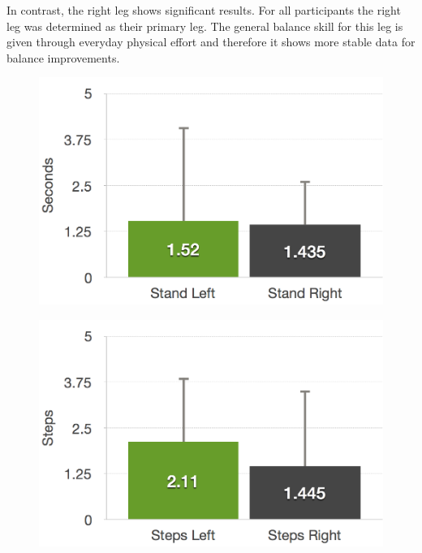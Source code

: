 In contrast, the right leg shows significant results.
For all participants the right leg was determined as their primary leg.
The general balance skill for this leg is given through everyday physical effort and therefore it shows more stable data for balance improvements.

\begin{figure}[htb]
	\centering
	\begin{minipage}[t]{0.32\linewidth}
		\centering
		\includegraphics[width=1\linewidth]{Pictures/6_4_DIA_StandAllDiff}
		\label{fig:6_4_standAllDiff}
	\end{minipage}
	\hfill
	\begin{minipage}[t]{0.32\linewidth}
		\centering
		\includegraphics[width=1\linewidth]{Pictures/6_4_DIA_StepsAllDiff}
		\label{fig:6_4_stepsAllDiff}
	\end{minipage}

\end{figure}
